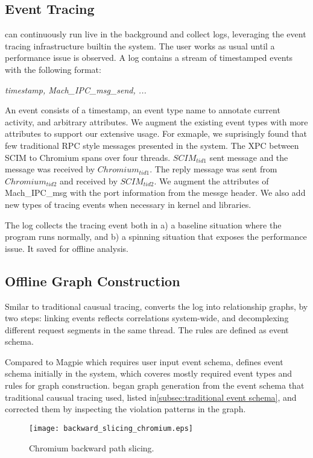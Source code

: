 \subsection{Event Tracing}

\xxx can continuously run live in the background and collect logs,
leveraging the event tracing infrastructure builtin the system.
The user works as usual until a performance issue is observed.
A log contains a stream of timestamped events with the following format:

\textit{timestamp, Mach\_IPC\_msg\_send, ...}

An event consists of a timestamp, an event type name to annotate current activity,
and arbitrary attributes.
We augment the existing event types with more attributes to support our extensive usage.
For exmaple, we suprisingly found that few traditional RPC style messages presented in the system.
The XPC between SCIM to Chromium spans over four threads.
$SCIM_{tid1}$ sent message and the message was received by $Chromium_{tid1}$.
The reply message was sent from $Chromium_{tid2}$ and received by $SCIM_{tid2}$.
We augment the attributes of Mach\_IPC\_msg with the port information from the messge header.
We also add new types of tracing events when necessary in kernel and libraries.

The log collects the tracing event both in 
a) a baseline situation where the program runs normally,
and b) a spinning situation that exposes the performance issue.
It saved for offline analysis.

\subsection{Offline Graph Construction}
Smilar to traditional causual tracing,
\xxx converts the log into relationship graphs,
by two steps:
linking events reflects correlations system-wide, 
and decomplexing different request segments in the same thread.
The rules are defined as event schema.

Compared to Magpie which requires user input event schema,
\xxx defines event schema initially in the system,
which coveres mostly required event types and rules
for graph construction.
\xxx began graph generation from the event schema
that traditional causual tracing used,
listed in\ref{subsec:traditional event schema},
and corrected them by inspecting the violation patterns in the graph.

\begin{figure*}[tb]
    \centering
    \texttt{[image: backward\_slicing\_chromium.eps]}
    \caption{Chromium backward path slicing.}
    \label{fig:path-slice-on-chromium}
\end{figure*}

